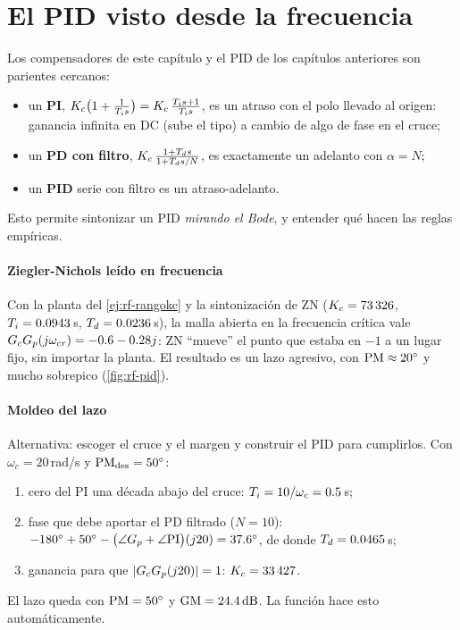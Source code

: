 \section{El PID visto desde la frecuencia}
\label{sec:rf-pid}

Los compensadores de este capítulo y el PID de los capítulos anteriores son parientes cercanos:
\begin{itemize}
  \item un \textbf{PI}, $K_c\big(1+\frac{1}{T_i s}\big)=K_c\,\frac{T_i s+1}{T_i s}$, es un atraso con el polo llevado al origen: ganancia infinita en DC (sube el tipo) a cambio de algo de fase en el cruce;
  \item un \textbf{PD con filtro}, $K_c\,\frac{1+T_d s}{1+T_d s/N}$, es exactamente un adelanto con $\alpha=N$;
  \item un \textbf{PID} serie con filtro es un atraso-adelanto.
\end{itemize}
Esto permite sintonizar un PID \emph{mirando el Bode}, y entender qué hacen las reglas empíricas.

\paragraph{Ziegler-Nichols leído en frecuencia}
Con la planta del \cref{ej:rf-rangokc} y la sintonización de ZN ($K_c=73\,326$, $T_i=0.0943$\,s, $T_d=0.0236$\,s), la malla abierta en la frecuencia crítica vale $G_cG_p(j\omega_{cr})=-0.6-0.28j$: ZN ``mueve'' el punto que estaba en $-1$ a un lugar fijo, sin importar la planta. El resultado es un lazo agresivo, con $\mathrm{PM}\approx20^{\circ}$ y mucho sobrepico (\cref{fig:rf-pid}).

\paragraph{Moldeo del lazo}
Alternativa: escoger el cruce y el margen y construir el PID para cumplirlos. Con $\omega_c=20$\,rad/s y $\mathrm{PM}_{\mathrm{des}}=50^{\circ}$:
\begin{enumerate}
  \item cero del PI una década abajo del cruce: $T_i=10/\omega_c=0.5$\,s;
  \item fase que debe aportar el PD filtrado ($N=10$): $-180^{\circ}+50^{\circ}-\big(\angle G_p+\angle\mathrm{PI}\big)(j20)=37.6^{\circ}$, de donde $T_d=0.0465$\,s;
  \item ganancia para que $|G_cG_p(j20)|=1$: $K_c=33\,427$.
\end{enumerate}
El lazo queda con $\mathrm{PM}=50^{\circ}$ y $\mathrm{GM}=24.4\,\mathrm{dB}$. La función  hace esto automáticamente.

